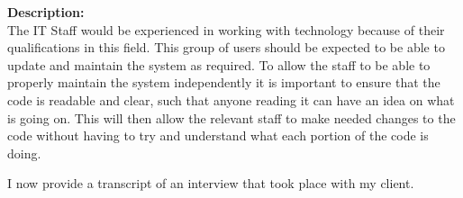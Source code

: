 \textbf{Description: } \\

The IT Staff would be experienced in working with technology
because of their qualifications in this field. This group of 
users should be expected to be able to update and maintain the 
system as required. To allow the staff to be able to properly 
maintain the system independently it is important to ensure
that the code is readable and clear, such that anyone reading
it can have an idea on what is going on. This will then allow
the relevant staff to make needed changes to the code without
having to try and understand what each portion of the code is
doing.\vspace{0.2cm}

I now provide a transcript of an interview that took place 
with my client.

